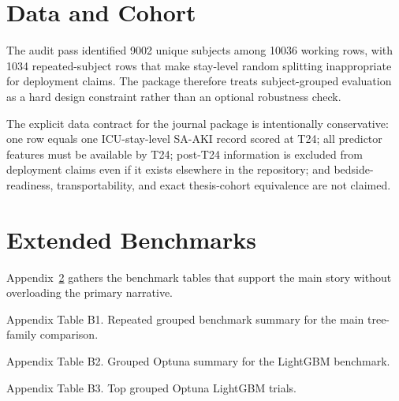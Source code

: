 \documentclass[unnumsec,webpdf,contemporary,large,numbered,nocrop]{oup-authoring-template}
\begin{document}
\begin{appendices}

\section{Data and Cohort}\label{app:data}
The audit pass identified 9002 unique subjects among 10036 working rows, with 1034 repeated-subject rows that make stay-level random splitting inappropriate for deployment claims. The package therefore treats subject-grouped evaluation as a hard design constraint rather than an optional robustness check.

The explicit data contract for the journal package is intentionally conservative: one row equals one ICU-stay-level SA-AKI record scored at T24; all predictor features must be available by T24; post-T24 information is excluded from deployment claims even if it exists elsewhere in the repository; and bedside-readiness, transportability, and exact thesis-cohort equivalence are not claimed.

\section{Extended Benchmarks}\label{app:benchmarks}
Appendix~\ref{app:benchmarks} gathers the benchmark tables that support the main story without overloading the primary narrative.

\begin{table}[!t]
\centering
\small
\caption{Appendix Table B1. Repeated grouped benchmark summary for the main tree-family comparison.}
\label{tab:app-b1}
\begin{adjustbox}{max width=\linewidth}

\end{adjustbox}
\end{table}


\begin{table}[!t]
\centering
\small
\caption{Appendix Table B2. Grouped Optuna summary for the LightGBM benchmark.}
\label{tab:app-b2}
\begin{adjustbox}{max width=\textwidth}

\end{adjustbox}
\end{table}


\begin{table}[!t]
\centering
\scriptsize
\caption{Appendix Table B3. Top grouped Optuna LightGBM trials.}
\label{tab:app-b3}
\begin{adjustbox}{max width=\textwidth}

\end{adjustbox}
\end{table}



\end{appendices}
\end{document}
